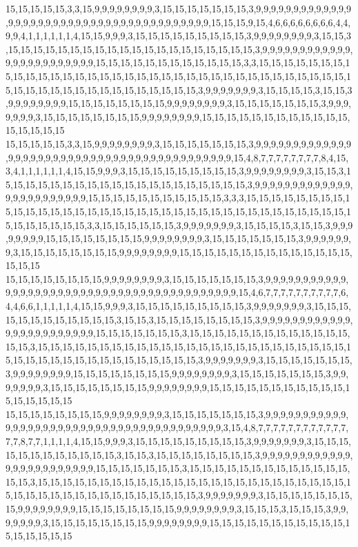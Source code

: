 15,15,15,15,15,3,3,15,9,9,9,9,9,9,9,9,3,15,15,15,15,15,15,15,3,9,9,9,9,9,9,9,9,9,9,9,9,9,9,9,9,9,9,9,9,9,9,9,9,9,9,9,9,9,9,9,9,9,9,9,9,9,9,9,9,15,15,15,9,15,4,6,6,6,6,6,6,6,6,4,4,9,9,4,1,1,1,1,1,1,4,15,15,9,9,9,3,15,15,15,15,15,15,15,15,15,3,9,9,9,9,9,9,9,9,3,15,15,3,15,15,15,15,15,15,15,15,15,15,15,15,15,15,15,15,15,15,15,15,3,9,9,9,9,9,9,9,9,9,9,9,9,9,9,9,9,9,9,9,9,9,9,9,9,15,15,15,15,15,15,15,15,15,15,15,15,3,3,15,15,15,15,15,15,15,15,15,15,15,15,15,15,15,15,15,15,15,15,15,15,15,15,15,15,15,15,15,15,15,15,15,15,15,15,15,15,15,15,15,15,15,15,15,15,15,15,15,15,15,3,9,9,9,9,9,9,9,3,15,15,15,15,3,15,15,3,9,9,9,9,9,9,9,9,15,15,15,15,15,15,15,15,9,9,9,9,9,9,9,9,3,15,15,15,15,15,15,15,3,9,9,9,9,9,9,9,3,15,15,15,15,15,15,15,15,9,9,9,9,9,9,9,9,15,15,15,15,15,15,15,15,15,15,15,15,15,15,15,15,15
15,15,15,15,15,3,3,15,9,9,9,9,9,9,9,9,3,15,15,15,15,15,15,15,3,9,9,9,9,9,9,9,9,9,9,9,9,9,9,9,9,9,9,9,9,9,9,9,9,9,9,9,9,9,9,9,9,9,9,9,9,9,9,9,9,9,9,9,15,4,8,7,7,7,7,7,7,7,7,8,4,15,3,4,1,1,1,1,1,1,4,15,15,9,9,9,3,15,15,15,15,15,15,15,15,15,3,9,9,9,9,9,9,9,9,3,15,15,3,15,15,15,15,15,15,15,15,15,15,15,15,15,15,15,15,15,15,15,15,3,9,9,9,9,9,9,9,9,9,9,9,9,9,9,9,9,9,9,9,9,9,9,9,9,15,15,15,15,15,15,15,15,15,15,15,3,3,3,15,15,15,15,15,15,15,15,15,15,15,15,15,15,15,15,15,15,15,15,15,15,15,15,15,15,15,15,15,15,15,15,15,15,15,15,15,15,15,15,15,15,15,3,3,15,15,15,15,15,15,3,9,9,9,9,9,9,9,3,15,15,15,15,3,15,15,3,9,9,9,9,9,9,9,9,15,15,15,15,15,15,15,15,9,9,9,9,9,9,9,9,3,15,15,15,15,15,15,15,3,9,9,9,9,9,9,9,3,15,15,15,15,15,15,15,15,9,9,9,9,9,9,9,9,15,15,15,15,15,15,15,15,15,15,15,15,15,15,15,15,15
15,15,15,15,15,15,15,15,9,9,9,9,9,9,9,9,3,15,15,15,15,15,15,15,3,9,9,9,9,9,9,9,9,9,9,9,9,9,9,9,9,9,9,9,9,9,9,9,9,9,9,9,9,9,9,9,9,9,9,9,9,9,9,9,9,9,9,15,4,6,7,7,7,7,7,7,7,7,7,7,6,4,4,6,6,1,1,1,1,1,4,15,15,9,9,9,3,15,15,15,15,15,15,15,15,15,3,9,9,9,9,9,9,9,3,15,15,15,15,15,15,15,15,15,15,15,15,3,15,15,3,15,15,15,15,15,15,15,15,3,9,9,9,9,9,9,9,9,9,9,9,9,9,9,9,9,9,9,9,9,9,9,9,9,15,15,15,15,15,15,15,3,15,15,15,15,15,15,15,15,15,15,15,15,15,15,15,3,15,15,15,15,15,15,15,15,15,15,15,15,15,15,15,15,15,15,15,15,15,15,15,15,15,15,15,15,15,15,15,15,15,15,15,15,15,15,15,15,15,3,9,9,9,9,9,9,9,3,15,15,15,15,15,15,15,3,9,9,9,9,9,9,9,9,15,15,15,15,15,15,15,15,9,9,9,9,9,9,9,9,3,15,15,15,15,15,15,15,3,9,9,9,9,9,9,9,3,15,15,15,15,15,15,15,15,9,9,9,9,9,9,9,9,15,15,15,15,15,15,15,15,15,15,15,15,15,15,15,15,15
15,15,15,15,15,15,15,15,9,9,9,9,9,9,9,9,3,15,15,15,15,15,15,15,3,9,9,9,9,9,9,9,9,9,9,9,9,9,9,9,9,9,9,9,9,9,9,9,9,9,9,9,9,9,9,9,9,9,9,9,9,9,9,9,9,3,15,4,8,7,7,7,7,7,7,7,7,7,7,7,7,7,7,8,7,7,1,1,1,1,4,15,15,9,9,9,3,15,15,15,15,15,15,15,15,15,3,9,9,9,9,9,9,9,3,15,15,15,15,15,15,15,15,15,15,15,15,3,15,15,3,15,15,15,15,15,15,15,15,3,9,9,9,9,9,9,9,9,9,9,9,9,9,9,9,9,9,9,9,9,9,9,9,9,15,15,15,15,15,15,15,3,15,15,15,15,15,15,15,15,15,15,15,15,15,15,15,3,15,15,15,15,15,15,15,15,15,15,15,15,15,15,15,15,15,15,15,15,15,15,15,15,15,15,15,15,15,15,15,15,15,15,15,15,15,15,15,15,15,3,9,9,9,9,9,9,9,3,15,15,15,15,15,15,15,15,9,9,9,9,9,9,9,9,15,15,15,15,15,15,15,15,9,9,9,9,9,9,9,9,3,15,15,15,3,15,15,15,3,9,9,9,9,9,9,9,3,15,15,15,15,15,15,15,15,9,9,9,9,9,9,9,9,15,15,15,15,15,15,15,15,15,15,15,15,15,15,15,15,15
